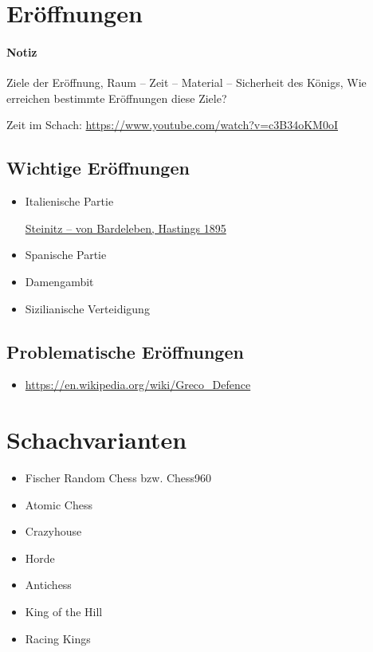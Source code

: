 \documentclass[
  a4paper,
  justified,
  nobib,
]{tufte-handout}
\newenvironment{notiz}{
  \color{Maroon}
  \paragraph*{Notiz}
}{
  \color{black}
}
\begin{document}
\section{Eröffnungen}%
\label{sec:eroffnungen}

\begin{notiz}
  Ziele der Eröffnung, Raum – Zeit – Material – Sicherheit des Königs, Wie erreichen
  bestimmte Eröffnungen diese Ziele?

  Zeit im Schach: \url{https://www.youtube.com/watch?v=c3B34oKM0oI}
\end{notiz}

\subsection{Wichtige Eröffnungen}%
\label{sub:wichtige_eroffnungen}

\begin{itemize}
  \item Italienische Partie

    \href{https://de.wikipedia.org/wiki/Steinitz_–_von_Bardeleben,_Hastings_1895}{Steinitz
    – von Bardeleben, Hastings 1895}
  \item Spanische Partie
  \item Damengambit
  \item Sizilianische Verteidigung
\end{itemize}

\subsection{Problematische Eröffnungen}%
\label{sub:problematische_eroffnungen}

\begin{itemize}
  \item \url{https://en.wikipedia.org/wiki/Greco_Defence}
\end{itemize}

\pagebreak

\section{Schachvarianten}%
\label{sec:schachvarianten}

\begin{itemize}
  \item Fischer Random Chess bzw. Chess960
  \item Atomic Chess
  \item Crazyhouse
  \item Horde
  \item Antichess
  \item King of the Hill
  \item Racing Kings
\end{itemize}
\end{document}
